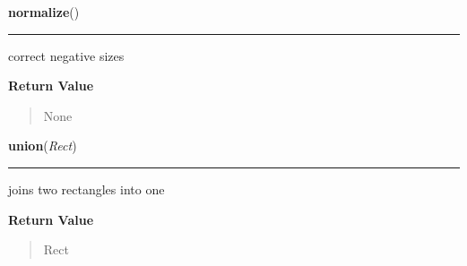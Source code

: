     \label{pygame:Rect:normalize}

    \vspace{0.5ex}

\hspace{.8\funcindent}\begin{boxedminipage}{\funcwidth}

    \raggedright \textbf{normalize}()

    \vspace{-1.5ex}

    \rule{\textwidth}{0.5\fboxrule}
\setlength{\parskip}{2ex}
    correct negative sizes

\setlength{\parskip}{1ex}
      \textbf{Return Value}
    \vspace{-1ex}

      \begin{quote}
      None

      \end{quote}

    \end{boxedminipage}

    \label{pygame:Rect:union}

    \vspace{0.5ex}

\hspace{.8\funcindent}\begin{boxedminipage}{\funcwidth}

    \raggedright \textbf{union}(\textit{Rect})

    \vspace{-1.5ex}

    \rule{\textwidth}{0.5\fboxrule}
\setlength{\parskip}{2ex}
    joins two rectangles into one

\setlength{\parskip}{1ex}
      \textbf{Return Value}
    \vspace{-1ex}

      \begin{quote}
      Rect

      \end{quote}

    \end{boxedminipage}

    \label{pygame:Rect:union_ip}

    \vspace{0.5ex}

